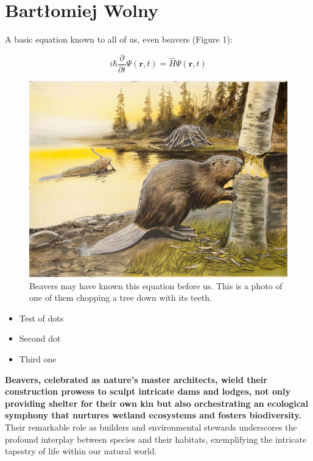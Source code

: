 \section{Bartłomiej Wolny}
A basic equation known to all of us, even beavers (Figure 1):

\begin{equation}
i \hbar \frac{\partial}{\partial t}\Psi(\mathbf{r},t) = \hat H \Psi(\mathbf{r},t)
\end{equation}

\begin{figure}[H]
    \centering
    \includegraphics[width=.55\textwidth]{pictures/Beaver-hero.jpg}
    \caption{Beavers may have known this equation before us. This is a photo of one of them chopping a tree down with its teeth.}
    \label{fig:beaver-image}
\end{figure}

\begin{itemize}
    \item Test of dots
    \item Second dot
    \item Third one
\end{itemize}




\textbf{Beavers, celebrated as nature's master architects, wield their construction prowess to sculpt intricate dams and lodges, not only providing shelter for their own kin but also orchestrating an ecological symphony that nurtures wetland ecosystems and fosters biodiversity.} Their remarkable role as builders and environmental stewards underscores the profound interplay between species and their habitats, exemplifying the intricate tapestry of life within our natural world.
